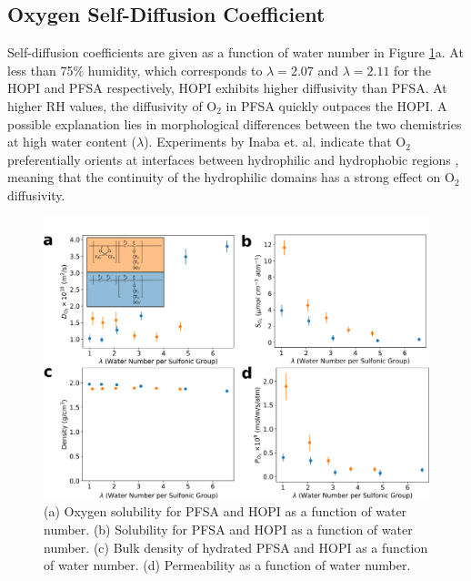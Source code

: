 \documentclass[journal=jacsat,manuscript=article]{achemso}
\begin{document}
\subsection{Oxygen Self-Diffusion Coefficient}
Self-diffusion coefficients are given as a function of water number in Figure \ref{fig:diffdenssol}a. At less than 75\% humidity,  which corresponds to $\lambda=2.07$ and $\lambda=2.11$ for the HOPI and PFSA respectively, HOPI exhibits higher diffusivity than PFSA. At higher RH values, the diffusivity of O$_2$ in PFSA quickly outpaces the HOPI. A possible explanation lies in morphological differences between the two chemistries at high water content ($\lambda$). Experiments by Inaba et. al. indicate that O$_2$ preferentially orients at interfaces between hydrophilic and hydrophobic regions \cite{inaba_oxygen_1993}, meaning that the continuity of the hydrophilic domains has a strong effect on O$_2$ diffusivity. 
\begin{figure}[h!]
  \includegraphics[width=\linewidth]{diffdenssol.png}
  \centering
  \caption{(a) Oxygen solubility for PFSA and HOPI as a function of water number. (b) Solubility for PFSA and HOPI as a function of water number. (c) Bulk density of hydrated PFSA and HOPI as a function of water number. (d) Permeability as a function of water number.}
    \label{fig:diffdenssol}
\end{figure}
\end{document}
